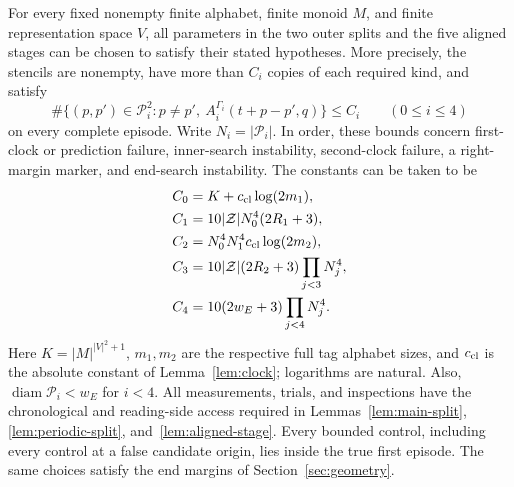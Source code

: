 \begin{proposition}\label{prop:parameters}
For every fixed nonempty finite alphabet, finite monoid \(M\), and
finite representation space \(V\), all parameters in the two outer
splits and the five aligned stages can be chosen to satisfy their
stated hypotheses. More precisely, the stencils are nonempty, have
more than \(C_i\) copies of each required kind, and satisfy
\[
 \#\{(p,p')\in\mathcal P_i^2:p\ne p',\
       A_i^{\Gamma_i}(t+p-p',q)\}\le C_i
       \qquad(0\le i\le4)
\]
on every complete episode. Write \(N_i=|\mathcal P_i|\).
In order, these bounds concern first-clock or prediction failure,
inner-search instability, second-clock failure, a right-margin marker,
and end-search instability. The constants can be taken to be
\begin{align}
 C_0&=K+c_{\rm cl}\log(2m_1),\label{eq:parameter-c0}\\
 C_1&=10|\mathcal Z|N_0^4(2R_1+3),\label{eq:parameter-c1}\\
 C_2&=N_0^4N_1^4c_{\rm cl}\log(2m_2),\label{eq:parameter-c2}\\
 C_3&=10|\mathcal Z|(2R_2+3)\prod_{j<3}N_j^4,
       \label{eq:parameter-c3}\\
 C_4&=10(2w_E+3)\prod_{j<4}N_j^4.
       \label{eq:parameter-c4}
\end{align}
Here \(K=|M|^{|V|^2+1}\), \(m_1,m_2\) are the respective full tag
alphabet sizes, and \(c_{\rm cl}\) is the absolute constant of
Lemma~\ref{lem:clock}; logarithms are natural. Also,
\(\operatorname{diam}\mathcal P_i<w_E\) for \(i<4\).
All measurements, trials, and inspections have the chronological and
reading-side access required in Lemmas~\ref{lem:main-split},
\ref{lem:periodic-split}, and~\ref{lem:aligned-stage}. Every bounded
control, including every control at a false candidate origin, lies
inside the true first episode. The same choices satisfy the end
margins of Section~\ref{sec:geometry}.
\end{proposition}

